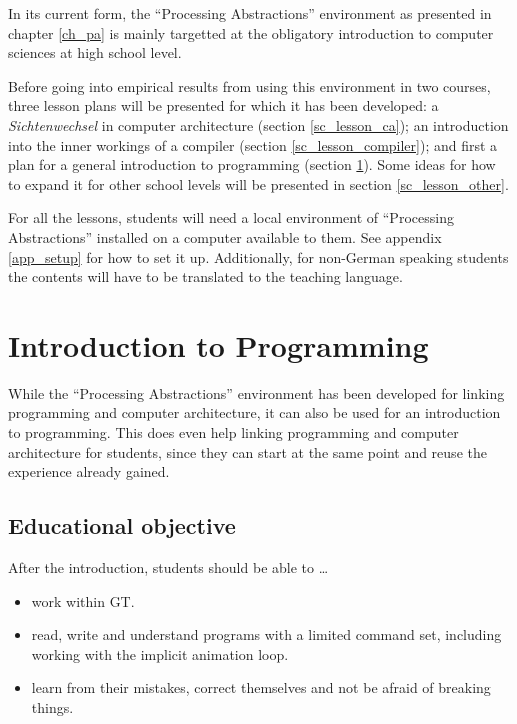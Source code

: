 In its current form, the ``Processing Abstractions'' environment as presented in chapter \ref{ch_pa} is mainly targetted at the obligatory introduction to computer sciences at high school level.

Before going into empirical results from using this environment in two courses, three lesson plans will be presented for which it has been developed: a \emph{Sichtenwechsel} in computer architecture (section \ref{sc_lesson_ca}); an introduction into the inner workings of a compiler (section \ref{sc_lesson_compiler}); and first a plan for a general introduction to programming (section \ref{sc_lesson_intro}). Some ideas for how to expand it for other school levels will be presented in section \ref{sc_lesson_other}.

For all the lessons, students will need a local environment of ``Processing Abstractions'' installed on a computer available to them. See appendix \ref{app_setup} for how to set it up. Additionally, for non-German speaking students the contents will have to be translated to the teaching language.



\section{Introduction to Programming} \label{sc_lesson_intro}

While the ``Processing Abstractions'' environment has been developed for linking programming and computer architecture, it can also be used for an introduction to programming. This does even help linking programming and computer architecture for students, since they can start at the same point and reuse the experience already gained.


\subsection{Educational objective}

After the introduction, students should be able to \dots
\begin{itemize}
\item work within \ac{GT}.
\item read, write and understand programs with a limited command set, including working with the implicit animation loop.
\item learn from their mistakes, correct themselves and not be afraid of breaking things.
\end{itemize}

